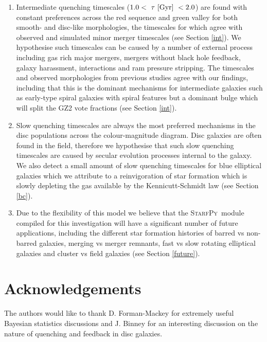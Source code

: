 \documentclass[useAMS,usenatbib]{mn2e}
\def\changed    {\color{titlecol} }
\def\starfpy {\textsc{StarfPy}}
\begin{document}
\begin{enumerate}
\item Intermediate quenching timescales ($1.0 < ~\tau~\rm{[Gyr]}~ < 2.0 $) are found with constant preferences across the red sequence and green valley for both smooth- and disc-like morphologies, the timescales for which agree with observed and simulated minor merger timescales (see Section \ref{int}). We hypothesise such timescales can be caused by a number of external process including gas rich major mergers, mergers without black hole feedback, galaxy harassment, interactions and ram pressure stripping. The timescales and observed morphologies from previous studies agree with our findings, including that this is the dominant mechanisms for intermediate galaxies such as early-type spiral galaxies with spiral features but a dominant bulge which will split the GZ2 vote fractions (see Section \ref{int}). 

\item Slow quenching timescales are always the most preferred mechanisms in the disc populations across the colour-magnitude diagram. Disc galaxies are often found in the field, therefore we hypothesise that such slow quenching timescales are caused by secular evolution processes internal to the galaxy. {\changed We also detect a small amount of slow quenching timescales for blue elliptical galaxies which we attribute to a reinvigoration of star formation which is slowly depleting the gas available by the Kennicutt-Schmidt law (see Section \ref{bc}).}

\item Due to the flexibility of this model we believe that the \starfpy ~module compiled for this investigation will have a significant number of future applications, including the different star formation histories of barred vs non-barred galaxies, merging vs merger remnants, fast vs slow rotating elliptical galaxies and cluster vs field galaxies (see Section \ref{future}).
\end{enumerate}


\section*{Acknowledgements}
The authors would like to thank D. Forman-Mackey for extremely useful Bayesian statistics discussions and J. Binney for an interesting discussion on the nature of quenching and feedback in disc galaxies. 
\end{document}
